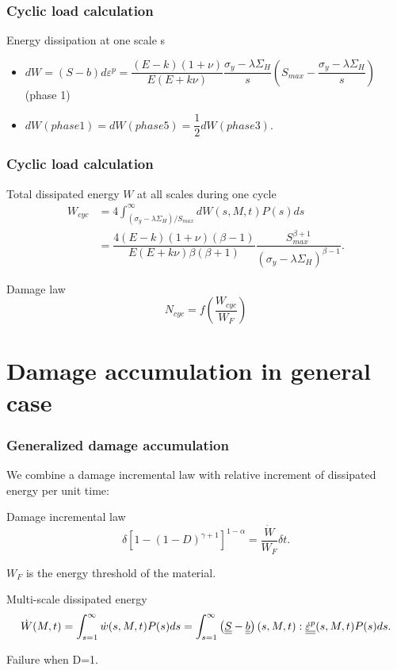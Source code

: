 \documentclass[xcolor=table]{Bredelebeamer}
\begin{document}
\begin{frame}
	\frametitle{Cyclic load calculation}	
	\begin{block}{Energy dissipation at one scale s}
		\begin{itemize}
			\item $dW=(S-b)d\varepsilon^p=\dfrac{(E-k)(1+\nu) }{E(E+k\nu)}\dfrac{\sigma_y-\lambda \Sigma_H}{s}\left(S_{max}-\dfrac{\sigma_y-\lambda \Sigma_H}{s}\right)
			$ (phase 1)
			
			\vspace{6pt}
			\item $dW(phase 1)=dW(phase 5)=\dfrac{1}{2}dW(phase 3).$
	    \end{itemize}	
	\end{block}
\end{frame}	

	\begin{frame}
		\frametitle{Cyclic load calculation}	
	\begin{block}{Total dissipated energy $W$  at all scales during one cycle}
		\begin{equation}
		\begin{split}
		W_{cyc}&=4\int_{\left( \sigma_y-\lambda \Sigma_H\right) /S_{max}}^{\infty}dW(s,M,t)P(s)ds
		\\&=\dfrac{4(E-k)(1+\nu)\left( \beta-1\right) }{ E(E+k\nu)\beta\left( \beta+1\right) }\dfrac{S_{max}^{\beta+1}}{\left( \sigma_y-\lambda \Sigma_H\right) ^{\beta-1}}.
		\end{split}
		\end{equation}
	\end{block}
	\begin{block}{Damage law}
		\begin{equation}
N_{cyc}=f\left(\dfrac{W_{cyc}}{W_F} \right) 
		\end{equation}
	\end{block}
\end{frame}	


\section{Damage accumulation in general case}
\begin{frame}
	\frametitle{Generalized damage accumulation}	
	We combine a damage incremental law with relative increment of dissipated energy per unit time:
	\begin{block}{Damage incremental law}	
\begin{equation}
	\delta [1-(1-D)^{\gamma+1}]^{1-\alpha}=\dfrac{\dot{W}}{W_F}\delta t.
	\label{dt}
\end{equation}
	\end{block}
	$W_F$ is the energy threshold of the material.	
		\begin{block}{Multi-scale dissipated energy}	
\begin{equation}\dot{W}(M,t)=\int_{s=1}^{\infty}\dot{w}(s,M,t)P(s)ds=\int_{s=1}^{\infty}\left(\uline{\uline{S}}-\uline{\uline{b}} \right) (s,M,t):\uline{\uline{\dot{\varepsilon}^p}}(s,M,t)P(s)ds.
\end{equation}
		\end{block}
		Failure when D=1.
\end{frame}	
\end{document}
